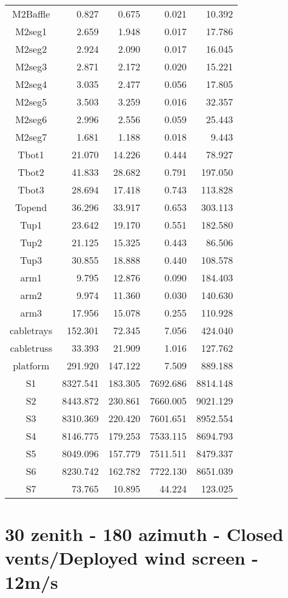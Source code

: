 \begin{longtable}{crrrr}
 M2Baffle & 0.827 & 0.675 & 0.021 & 10.392 \\
 M2seg1 & 2.659 & 1.948 & 0.017 & 17.786 \\
 M2seg2 & 2.924 & 2.090 & 0.017 & 16.045 \\
 M2seg3 & 2.871 & 2.172 & 0.020 & 15.221 \\
 M2seg4 & 3.035 & 2.477 & 0.056 & 17.805 \\
 M2seg5 & 3.503 & 3.259 & 0.016 & 32.357 \\
 M2seg6 & 2.996 & 2.556 & 0.059 & 25.443 \\
 M2seg7 & 1.681 & 1.188 & 0.018 & 9.443 \\
 Tbot1 & 21.070 & 14.226 & 0.444 & 78.927 \\
 Tbot2 & 41.833 & 28.682 & 0.791 & 197.050 \\
 Tbot3 & 28.694 & 17.418 & 0.743 & 113.828 \\
 Topend & 36.296 & 33.917 & 0.653 & 303.113 \\
 Tup1 & 23.642 & 19.170 & 0.551 & 182.580 \\
 Tup2 & 21.125 & 15.325 & 0.443 & 86.506 \\
 Tup3 & 30.855 & 18.888 & 0.440 & 108.578 \\
 arm1 & 9.795 & 12.876 & 0.090 & 184.403 \\
 arm2 & 9.974 & 11.360 & 0.030 & 140.630 \\
 arm3 & 17.956 & 15.078 & 0.255 & 110.928 \\
 cabletrays & 152.301 & 72.345 & 7.056 & 424.040 \\
 cabletruss & 33.393 & 21.909 & 1.016 & 127.762 \\
 platform & 291.920 & 147.122 & 7.509 & 889.188 \\
 S1 & 8327.541 & 183.305 & 7692.686 & 8814.148 \\
 S2 & 8443.872 & 230.861 & 7660.005 & 9021.129 \\
 S3 & 8310.369 & 220.420 & 7601.651 & 8952.554 \\
 S4 & 8146.775 & 179.253 & 7533.115 & 8694.793 \\
 S5 & 8049.096 & 157.779 & 7511.511 & 8479.337 \\
 S6 & 8230.742 & 162.782 & 7722.130 & 8651.039 \\
 S7 & 73.765 & 10.895 & 44.224 & 123.025 \\
\bottomrule
\end{longtable}




\section{30 zenith - 180 azimuth - Closed vents/Deployed wind screen - 12m/s}
\label{zen30az180_CD12}

